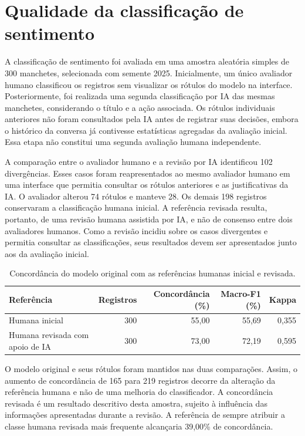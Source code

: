 \section{Qualidade da classificação de sentimento}
\label{sec:avaliacao_sentimento}

A classificação de sentimento foi avaliada em uma amostra aleatória simples de 300 manchetes, selecionada com semente 2025. Inicialmente, um único avaliador humano classificou os registros sem visualizar os rótulos do modelo na interface. Posteriormente, foi realizada uma segunda classificação por IA das mesmas manchetes, considerando o título e a ação associada. Os rótulos individuais anteriores não foram consultados pela IA antes de registrar suas decisões, embora o histórico da conversa já contivesse estatísticas agregadas da avaliação inicial. Essa etapa não constitui uma segunda avaliação humana independente.

A comparação entre o avaliador humano e a revisão por IA identificou 102 divergências. Esses casos foram reapresentados ao mesmo avaliador humano em uma interface que permitia consultar os rótulos anteriores e as justificativas da IA. O avaliador alterou 74 rótulos e manteve 28. Os demais 198 registros conservaram a classificação humana inicial. A referência revisada resulta, portanto, de uma revisão humana assistida por IA, e não de consenso entre dois avaliadores humanos. Como a revisão incidiu sobre os casos divergentes e permitia consultar as classificações, seus resultados devem ser apresentados junto aos da avaliação inicial.

\begin{table}[H]
\centering
\caption{Concordância do modelo original com as referências humanas inicial e revisada.}
\label{tab:sentimento_antes_depois}
{\footnotesize
\begin{tabular}{@{}lrrrr@{}}
\hline
Referência & Registros & Concordância (\%) & Macro-F1 (\%) & Kappa \\ \hline
Humana inicial & 300 & 55,00 & 55,69 & 0,355 \\
Humana revisada com apoio de IA & 300 & 73,00 & 72,19 & 0,595 \\
\hline
\end{tabular}}
\par{}
\end{table}

O modelo original e seus rótulos foram mantidos nas duas comparações. Assim, o aumento de concordância de 165 para 219 registros decorre da alteração da referência humana e não de uma melhoria do classificador. A concordância revisada é um resultado descritivo desta amostra, sujeito à influência das informações apresentadas durante a revisão. A referência de sempre atribuir a classe humana revisada mais frequente alcançaria 39,00\% de concordância.

